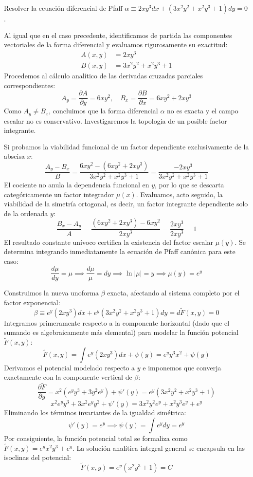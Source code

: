 \begin{ejercicio}
Resolver la ecuación diferencial de Pfaff $\alpha \equiv 2xy^3 dx + (3x^2y^2 + x^2y^3 + 1)dy = 0$.
\end{ejercicio}

\begin{tcolorbox}
Al igual que en el caso precedente, identificamos de partida las componentes vectoriales de la forma diferencial y evaluamos rigurosamente su exactitud:
\begin{align*}
    A(x,y) &= 2xy^3 \\
    B(x,y) &= 3x^2y^2 + x^2y^3 + 1 
\end{align*}
Procedemos al cálculo analítico de las derivadas cruzadas parciales correspondientes:
$$ A_y = \frac{\partial A}{\partial y} = 6xy^2, \quad B_x = \frac{\partial B}{\partial x} = 6xy^2 + 2xy^3 $$
Como $A_y \neq B_x$, concluimos que la forma diferencial $\alpha$ no es exacta y el campo escalar no es conservativo. Investigaremos la topología de un posible factor integrante.

Si probamos la viabilidad funcional de un factor dependiente exclusivamente de la abscisa $x$:
$$ \frac{A_y - B_x}{B} = \frac{6xy^2 - (6xy^2 + 2xy^3)}{3x^2y^2 + x^2y^3 + 1} = \frac{-2xy^3}{3x^2y^2 + x^2y^3 + 1} $$
El cociente no anula la dependencia funcional en $y$, por lo que se descarta categóricamente un factor integrador $\mu(x)$. Evaluamos, acto seguido, la viabilidad de la simetría ortogonal, es decir, un factor integrante dependiente solo de la ordenada $y$:
$$ \frac{B_x - A_y}{A} = \frac{(6xy^2 + 2xy^3) - 6xy^2}{2xy^3} = \frac{2xy^3}{2xy^3} = 1 $$
El resultado constante unívoco certifica la existencia del factor escalar $\mu(y)$. Se determina integrando inmediatamente la ecuación de Pfaff canónica para este caso:
$$ \frac{d\mu}{dy} = \mu \implies \frac{d\mu}{\mu} = dy \implies \ln|\mu| = y \implies \mu(y) = e^y $$

Construimos la nueva unoforma $\beta$ exacta, afectando al sistema completo por el factor exponencial:
$$ \beta \equiv e^y(2xy^3)dx + e^y(3x^2y^2 + x^2y^3 + 1)dy = d\tilde{F}(x,y) = 0 $$
Integramos primeramente respecto a la componente horizontal (dado que el sumando es algebraicamente más elemental) para modelar la función potencial $\tilde{F}(x,y)$:
$$ \tilde{F}(x,y) = \int e^y(2xy^3)dx + \psi(y) = e^y y^3 x^2 + \psi(y) $$
Derivamos el potencial modelado respecto a $y$ e imponemos que converja exactamente con la componente vertical de $\beta$:
$$ \frac{\partial \tilde{F}}{\partial y} = x^2(e^y y^3 + 3y^2e^y) + \psi'(y) = e^y(3x^2y^2 + x^2y^3 + 1) $$
$$ x^2e^yy^3 + 3x^2e^yy^2 + \psi'(y) = 3x^2y^2e^y + x^2y^3e^y + e^y $$
Eliminando los términos invariantes de la igualdad simétrica:
$$ \psi'(y) = e^y \implies \psi(y) = \int e^y dy = e^y $$
Por consiguiente, la función potencial total se formaliza como $\tilde{F}(x,y) = e^y x^2 y^3 + e^y$.
La solución analítica integral general se encapsula en las isoclinas del potencial:
$$ \tilde{F}(x,y) = e^y(x^2y^3 + 1) = C $$


\end{tcolorbox}
